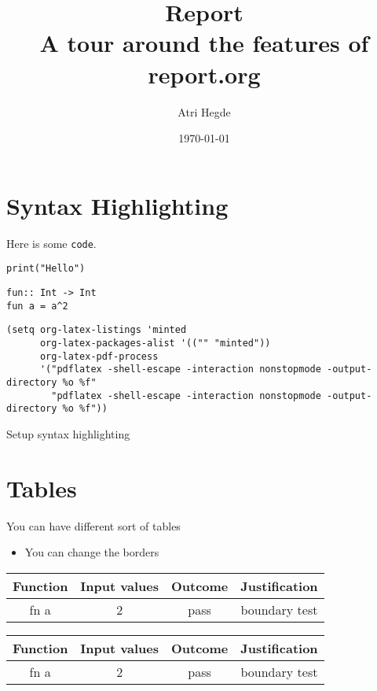 \documentclass[a4paper,11pt]{article}
\author{Atri Hegde}
\date{\today}
\title{Report\\\medskip
\large A tour around the features of report.org}
\begin{document}
\maketitle
\tableofcontents

\newpage
\section{Syntax Highlighting}
\label{sec:org7c66b9a}
Here is some \texttt{code}.


\begin{verbatim}
print("Hello")
\end{verbatim}

\begin{verbatim}
fun:: Int -> Int
fun a = a^2
\end{verbatim}

\begin{listing}[htbp]
\begin{verbatim}
(setq org-latex-listings 'minted
      org-latex-packages-alist '(("" "minted"))
      org-latex-pdf-process
      '("pdflatex -shell-escape -interaction nonstopmode -output-directory %o %f"
        "pdflatex -shell-escape -interaction nonstopmode -output-directory %o %f"))
\end{verbatim}
\caption{Setup syntax highlighting}
\end{listing}
\section{Tables}
\label{sec:org7e39aaa}

You can have different sort of tables

\begin{itemize}
\item You can change the borders
\end{itemize}
\begin{center}
\begin{tabular}{c|c|c|c}
Function & Input values & Outcome & Justification\\[0pt]
\hline
fn a & 2 & pass & boundary test\\[0pt]
\end{tabular}
\end{center}

\begin{center}
\begin{tabular}{|c|c|c|c|}
Function & Input values & Outcome & Justification\\[0pt]
\hline
fn a & 2 & pass & boundary test\\[0pt]
\end{tabular}
\end{center}
\end{document}
